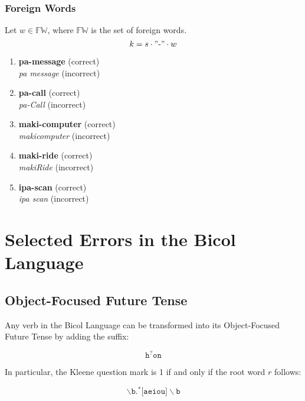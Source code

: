 \subsubsection{Foreign Words}
Let \(w \in \mathbb{FW}\), where \(\mathbb{FW}\) is the set of foreign words.
\[
      k = s \cdot "\text{-}" \cdot w
\]
\begin{example}
\end{example}
\begin{enumerate}
      \item \textbf{pa-message} (correct) \\
            \textit{pa message} (incorrect)
      \item \textbf{pa-call} (correct) \\
            \textit{pa-Call} (incorrect)
      \item \textbf{maki-computer} (correct) \\
            \textit{makicomputer} (incorrect)
      \item \textbf{maki-ride} (correct) \\
            \textit{makiRide} (incorrect)
      \item \textbf{ipa-scan} (correct) \\
            \textit{ipa scan} (incorrect)
\end{enumerate}

\section{Selected Errors in the Bicol Language}
\subsection{Object-Focused Future Tense}
Any verb in the Bicol Language can be transformed into its Object-Focused Future Tense by adding the suffix:

\[
      \texttt{h}^?\texttt{on}
\]

In particular, the Kleene question mark is 1 if and only if the root word $r$ follows:

\[
      \backslash\texttt{b.}^*\texttt{[aeiou]}\backslash\texttt{b}
\]

\begin{example}
\end{example}

